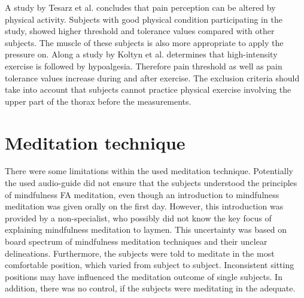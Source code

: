 
A study by Tesarz et al. \cite{Tesarz2012} concludes that pain perception can be altered by physical activity. Subjects with good physical condition participating in the study, showed higher threshold and tolerance values compared with other subjects. The muscle of these subjects is also more appropriate to apply the pressure on.
Along a study by Koltyn et al. \cite{Koltyn2002} determines that high-intensity exercise is followed by hypoalgesia. Therefore pain threshold as well as pain tolerance values increase during and after exercise. The exclusion criteria should take into account that subjects cannot practice physical exercise involving the upper part of the thorax before the measurements.





\section{Meditation technique}
There were some limitations within the used meditation technique. Potentially the used audio-guide did not ensure that the subjects understood the principles of mindfulness FA meditation, even though an introduction to mindfulness meditation was given orally on the first day. However, this introduction was provided by a non-specialist, who possibly did not know the key focus of explaining mindfulness meditation to laymen. This uncertainty was based on board spectrum of mindfulness meditation techniques and their unclear delineations. 
Furthermore, the subjects were told to meditate in the most comfortable position, which varied from subject to subject.  Inconsistent sitting positions may have influenced the meditation outcome of single subjects. In addition, there was no control, if the subjects were meditating in the adequate.

